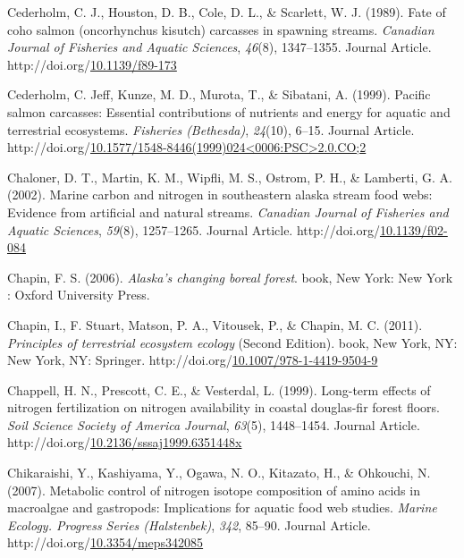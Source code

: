 \documentclass [11pt, proquest] {uwthesis}[2015/03/03]
\newlength{\cslhangindent}
\newenvironment{CSLReferences}%
{\setlength{\parindent}{0pt}%
\everypar{\setlength{\hangindent}{\cslhangindent}}\ignorespaces}%
{\par}
\begin{document}
\begin{CSLReferences}{1}{0}
\leavevmode\hypertarget{ref-Cederholm1989}{}%
Cederholm, C. J., Houston, D. B., Cole, D. L., \& Scarlett, W. J. (1989). Fate of coho salmon (oncorhynchus kisutch) carcasses in spawning streams. \emph{Canadian Journal of Fisheries and Aquatic Sciences}, \emph{46}(8), 1347--1355. Journal Article. http://doi.org/\href{https://doi.org/10.1139/f89-173}{10.1139/f89-173}

\leavevmode\hypertarget{ref-Cederholm1999}{}%
Cederholm, C. Jeff, Kunze, M. D., Murota, T., \& Sibatani, A. (1999). Pacific salmon carcasses: Essential contributions of nutrients and energy for aquatic and terrestrial ecosystems. \emph{Fisheries (Bethesda)}, \emph{24}(10), 6--15. Journal Article. http://doi.org/\href{https://doi.org/10.1577/1548-8446(1999)024\%3C0006:PSC\%3E2.0.CO;2}{10.1577/1548-8446(1999)024\textless0006:PSC\textgreater2.0.CO;2}

\leavevmode\hypertarget{ref-Chaloner2002}{}%
Chaloner, D. T., Martin, K. M., Wipfli, M. S., Ostrom, P. H., \& Lamberti, G. A. (2002). Marine carbon and nitrogen in southeastern alaska stream food webs: Evidence from artificial and natural streams. \emph{Canadian Journal of Fisheries and Aquatic Sciences}, \emph{59}(8), 1257--1265. Journal Article. http://doi.org/\href{https://doi.org/10.1139/f02-084}{10.1139/f02-084}

\leavevmode\hypertarget{ref-Chapin2006}{}%
Chapin, F. S. (2006). \emph{Alaska's changing boreal forest}. book, New York: New York : Oxford University Press.

\leavevmode\hypertarget{ref-Chapin2011}{}%
Chapin, I., F. Stuart, Matson, P. A., Vitousek, P., \& Chapin, M. C. (2011). \emph{Principles of terrestrial ecosystem ecology} (Second Edition). book, New York, NY: New York, NY: Springer. http://doi.org/\href{https://doi.org/10.1007/978-1-4419-9504-9}{10.1007/978-1-4419-9504-9}

\leavevmode\hypertarget{ref-Chapell1999}{}%
Chappell, H. N., Prescott, C. E., \& Vesterdal, L. (1999). Long-term effects of nitrogen fertilization on nitrogen availability in coastal douglas-fir forest floors. \emph{Soil Science Society of America Journal}, \emph{63}(5), 1448--1454. Journal Article. http://doi.org/\href{https://doi.org/10.2136/sssaj1999.6351448x}{10.2136/sssaj1999.6351448x}

\leavevmode\hypertarget{ref-Chikaraishi2007}{}%
Chikaraishi, Y., Kashiyama, Y., Ogawa, N. O., Kitazato, H., \& Ohkouchi, N. (2007). Metabolic control of nitrogen isotope composition of amino acids in macroalgae and gastropods: Implications for aquatic food web studies. \emph{Marine Ecology. Progress Series (Halstenbek)}, \emph{342}, 85--90. Journal Article. http://doi.org/\href{https://doi.org/10.3354/meps342085}{10.3354/meps342085}


\end{CSLReferences}
\end{document}
